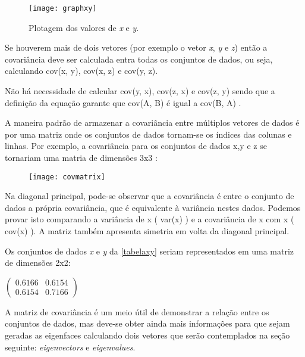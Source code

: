 \begin{figure}[h]
	\centering
	\texttt{[image: graphxy]}
	\caption{Plotagem dos valores de \textit{x} e \textit{y}.}
	\label{fig:graphxy}
\end{figure}

Se houverem mais de dois vetores (por exemplo o vetor \textit{x}, \textit{y} e \textit{z}) então a covariância deve ser calculada entra todas os conjuntos de dados, ou seja, calculando cov(x, y), cov(x, z) e cov(y, z). 

Não há necessidade de calcular cov(y, x), cov(z, x) e cov(z, y) sendo que a definição da equação garante que cov(A, B) é igual a cov(B, A) .

A maneira padrão de armazenar a covariância entre múltiplos vetores de dados é por uma matriz onde os conjuntos de dados tornam-se os índices das colunas e linhas. Por exemplo, a covariância para os conjuntos de dados x,y e z se tornariam uma matria de dimensões 3x3 \cite{drmathew_java_programming}:

\begin{figure}[h]
	\centering
	\texttt{[image: covmatrix]}
	\label{fig:covmatrix}
\end{figure}

Na diagonal principal, pode-se observar que a covariância é entre o conjunto de dados a própria covariância, que é equivalente à variância nestes dados. Podemos provar isto comparando a variância de x ( var(x) ) e a covariância de x com x ( cov(x) ). A matriz também apresenta simetria em volta da diagonal principal. 

Os conjuntos de dados \textit{x} e \textit{y} da \autoref{tabelaxy} seriam representados em uma matriz de dimensões 2x2:

\begin{center}
	$\begin{pmatrix} 0.6166 & 0.6154 \\ 0.6154 & 0.7166 \end{pmatrix}$
\end{center}


A matriz de covariância é um meio útil de demonstrar a relação entre os conjuntos de dados, mas deve-se obter ainda mais informações para que sejam geradas as eigenfaces calculando dois vetores que serão contemplados na seção seguinte: \textit{eigenvectors} e \textit{eigenvalues}.

